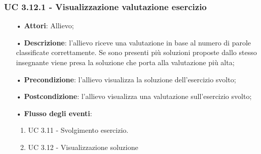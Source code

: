 \subsubsection{UC 3.12.1 - Visualizzazione valutazione esercizio}   

\begin{itemize}
\item[•]\textbf{Attori}: Allievo;
\item[•]\textbf{Descrizione}:  l'allievo riceve una valutazione in base al numero di parole classificate correttamente. Se sono presenti più soluzioni proposte dallo stesso insegnante viene presa la soluzione che porta alla valutazione più alta;
\item[•]\textbf{Precondizione}: l'allievo visualizza la soluzione dell'esercizio svolto;
\item[•]\textbf{Postcondizione}: l'allievo visualizza una valutazione sull'esercizio svolto;
\item[•]\textbf{Flusso degli eventi}:
\begin{enumerate}
	\item UC 3.11 - Svolgimento esercizio.
	\item UC 3.12 - Visualizzazione soluzione  
\end{enumerate}
\end{itemize}

